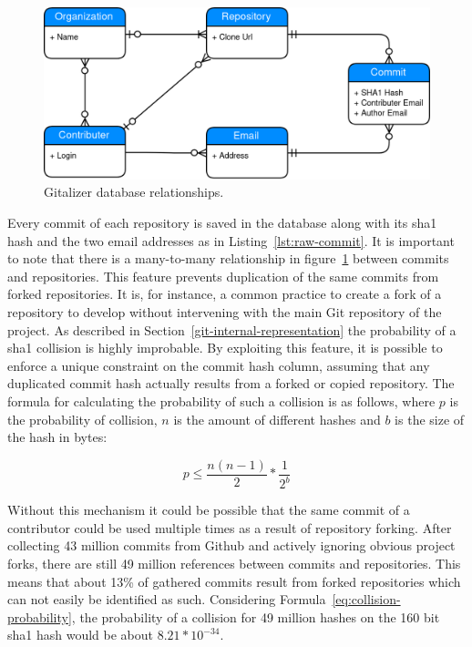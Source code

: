 \begin{figure}[H]
\includegraphics[scale=0.3]{./graphs/gitalizer-data-structure}
\centering
\caption{Gitalizer database relationships.}\label{fig:gitalizer-relationship}
\end{figure}

Every commit of each repository is saved in the database along with its \ac{sha1} hash and the two email addresses as in Listing~\ref{lst:raw-commit}.
It is important to note that there is a many-to-many relationship in figure~\ref{fig:gitalizer-relationship} between commits and repositories.
This feature prevents duplication of the same commits from forked repositories.
It is, for instance, a common practice to create a fork of a repository to develop without intervening with the main Git repository of the project.
As described in Section~\ref{git-internal-representation} the probability of a \ac{sha1} collision is highly improbable.
By exploiting this feature, it is possible to enforce a unique constraint on the commit hash column, assuming that any duplicated commit hash actually results from a forked or copied repository.
The formula for calculating the probability of such a collision is as follows, where $p$ is the probability of collision, $n$ is the amount of different hashes and $b$ is the size of the hash in bytes:

\begin{equation}\label{eq:collision-probability}
    p \leq \frac{n(n-1)}{2} * \frac{1}{2^{b}}
\end{equation}

Without this mechanism it could be possible that the same commit of a contributor could be used multiple times as a result of repository forking.
After collecting 43 million commits from Github and actively ignoring obvious project forks, there are still 49 million references between commits and repositories.
This means that about 13\% of gathered commits result from forked repositories which can not easily be identified as such.
Considering Formula~\ref{eq:collision-probability}, the probability of a collision for 49 million hashes on the 160 bit \ac{sha1} hash would be about $8.21 * 10^{-34}$.

